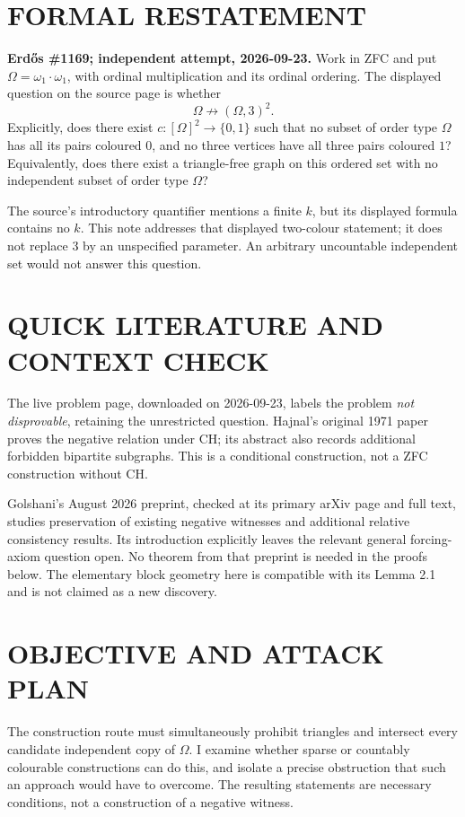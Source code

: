 \section{FORMAL RESTATEMENT}
\textbf{Erd\H{o}s \#1169; independent attempt, 2026-09-23.}
Work in ZFC and put $\Omega=\omega_1\cdot\omega_1$, with ordinal multiplication and its ordinal ordering. The displayed question on the source page is whether
\[
\Omega\not\longrightarrow(\Omega,3)^2.
\]
Explicitly, does there exist $c:[\Omega]^2\to\{0,1\}$ such that no subset of order type $\Omega$ has all its pairs coloured $0$, and no three vertices have all three pairs coloured $1$? Equivalently, does there exist a triangle-free graph on this ordered set with no independent subset of order type $\Omega$?

The source's introductory quantifier mentions a finite $k$, but its displayed formula contains no $k$. This note addresses that displayed two-colour statement; it does not replace $3$ by an unspecified parameter. An arbitrary uncountable independent set would not answer this question.

\section{QUICK LITERATURE AND CONTEXT CHECK}
The live problem page, downloaded on 2026-09-23, labels the problem \emph{not disprovable}, retaining the unrestricted question. Hajnal's original 1971 paper proves the negative relation under CH; its abstract also records additional forbidden bipartite subgraphs. This is a conditional construction, not a ZFC construction without CH.

Golshani's August 2026 preprint, checked at its primary arXiv page and full text, studies preservation of existing negative witnesses and additional relative consistency results. Its introduction explicitly leaves the relevant general forcing-axiom question open. No theorem from that preprint is needed in the proofs below. The elementary block geometry here is compatible with its Lemma 2.1 and is not claimed as a new discovery.

\section{OBJECTIVE AND ATTACK PLAN}
The construction route must simultaneously prohibit triangles and intersect every candidate independent copy of $\Omega$. I examine whether sparse or countably colourable constructions can do this, and isolate a precise obstruction that such an approach would have to overcome. The resulting statements are necessary conditions, not a construction of a negative witness.

